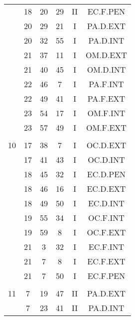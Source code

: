 \documentclass[12pt, a4paper]{article}
\begin{document}
\begin{multicols}{3}
{\begin{tabular}{c c c c c c}
	 	 	 	 & 18 & 20 & 29 & II & EC.F.PEN\\%
	 	 	 	 & 20 & 29 & 21 & I & PA.D.EXT\\%
	 	 	 	 & 20 & 32 & 55 & I & PA.D.INT\\%
	 	 	 	 & 21 & 37 & 11 & I & OM.D.EXT\\%
	 	 	 	 & 21 & 40 & 45 & I & OM.D.INT\\%
	 	 	 	 & 22 & 46 & 7 & I & PA.F.INT\\%
	 	 	 	 & 22 & 49 & 41 & I & PA.F.EXT\\%
	 	 	 	 & 23 & 54 & 17 & I & OM.F.INT\\%
	 	 	 	 & 23 & 57 & 49 & I & OM.F.EXT\\%
	 	 	 	 & & & & & \\%
	 	 	 	10 & 17 & 38 & 7 & I & OC.D.EXT\\%
	 	 	 	 & 17 & 41 & 43 & I & OC.D.INT\\%
	 	 	 	 & 18 & 45 & 32 & I & EC.D.PEN\\%
	 	 	 	 & 18 & 46 & 16 & I & EC.D.EXT\\%
	 	 	 	 & 18 & 49 & 50 & I & EC.D.INT\\%
	 	 	 	 & 19 & 55 & 34 & I & OC.F.INT\\%
	 	 	 	 & 19 & 59 & 8 & I & OC.F.EXT\\%
	 	 	 	 & 21 & 3 & 32 & I & EC.F.INT\\%
	 	 	 	 & 21 & 7 & 8 & I & EC.F.EXT\\%
	 	 	 	 & 21 & 7 & 50 & I & EC.F.PEN\\%
	 	 	 	 & & & & & \\%
	 	 	 	11 & 7 & 19 & 47 & II & PA.D.EXT\\%
	 	 	 	 & 7 & 23 & 41 & II & PA.D.INT\\%

\end{tabular}}
\end{multicols}
\end{document}
